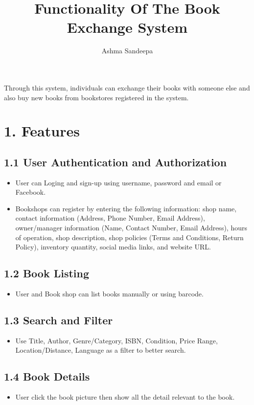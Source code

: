 \documentclass[english,10pt,a4paper]{article}
\title{Functionality Of The Book Exchange System}
\author{Ashma Sandeepa}
\begin{document}
	\maketitle
	\large{Through this system, individuals can exchange their books with someone else and also buy new books from bookstores registered in the system.}
	
	\section*{1. Features}
		\subsection*{1.1 User Authentication and Authorization}
			\begin{itemize}
			\item User can Loging and sign-up using username, password and email or Facebook.
			\item Bookshops can register by entering the following information: shop name, contact information (Address, Phone Number, Email Address), owner/manager information (Name, Contact Number, Email Address), hours of operation, shop description, shop policies (Terms and Conditions, Return Policy), inventory quantity, social media links, and website URL.
			\end{itemize}
		\subsection*{1.2 Book Listing}
			\begin{itemize}
				\item User and Book shop can list books manually or using barcode.
			\end{itemize}
		\subsection*{1.3 Search and Filter}
			\begin{itemize}
				\item Use Title, Author, Genre/Category, ISBN, Condition, Price Range, Location/Distance, Language as a filter to better search.
			\end{itemize}
		\subsection*{1.4 Book Details}
			\begin{itemize}
			\item User click the book picture then show all the detail relevant to the book.
			\end{itemize}
\end{document}
